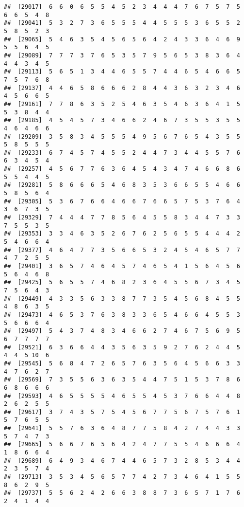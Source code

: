 \documentclass[
]{book}
\begin{document}
\begin{verbatim}
##  [29017]  6  6  0  6  5  5  4  5  2  3  4  4  4  7  6  7  5  7  5  6  6  5  4  8
##  [29041]  5  3  2  7  3  6  5  5  5  4  4  5  5  5  3  6  5  5  2  5  8  5  2  3
##  [29065]  5  4  6  3  5  4  5  6  5  6  4  2  4  3  3  6  4  6  9  5  5  6  4  5
##  [29089]  7  7  7  3  7  6  5  3  5  7  9  5  6  5  3  8  3  6  4  4  4  3  4  5
##  [29113]  5  6  5  1  3  4  4  6  5  5  7  4  4  6  5  4  6  6  5  7  5  7  6  8
##  [29137]  4  4  6  5  8  6  6  6  2  8  4  4  3  6  3  2  3  4  6  4  5  6  6  5
##  [29161]  7  7  8  6  3  5  2  5  4  6  3  5  4  6  3  6  4  1  5  5  3  8  4  4
##  [29185]  4  5  4  5  7  3  4  6  6  2  4  6  7  3  5  5  3  5  5  4  6  4  6  6
##  [29209]  3  5  8  3  4  5  5  5  4  9  5  6  7  6  5  4  3  5  5  5  8  5  5  5
##  [29233]  6  7  4  5  7  4  5  5  2  4  4  7  3  4  4  5  5  7  6  6  3  4  5  4
##  [29257]  4  5  6  7  7  6  3  6  4  5  4  3  4  7  4  6  6  8  6  5  5  4  4  5
##  [29281]  5  8  6  6  6  5  4  6  8  3  5  3  6  6  5  5  4  6  6  5  8  5  6  4
##  [29305]  5  3  6  7  6  6  4  6  6  7  6  6  5  7  5  3  7  6  4  3  6  7  3  5
##  [29329]  7  4  4  4  7  7  8  5  6  4  5  5  8  3  4  4  7  3  3  7  5  5  3  5
##  [29353]  3  3  4  6  3  5  2  6  7  6  2  5  6  5  5  4  4  4  2  5  4  6  6  4
##  [29377]  4  6  4  7  7  3  5  6  6  5  3  2  4  5  4  6  5  7  7  4  7  2  5  5
##  [29401]  3  6  5  7  4  6  4  5  7  4  6  5  4  1  5  6  4  5  6  5  6  4  6  8
##  [29425]  5  6  5  5  7  4  6  8  2  3  6  4  5  5  6  7  3  4  5  7  5  6  4  3
##  [29449]  4  3  3  5  6  3  3  8  7  7  3  5  4  5  6  8  4  5  5  4  8  6  3  5
##  [29473]  4  6  5  3  7  6  3  8  3  3  6  5  4  6  6  4  5  5  3  5  6  6  6  4
##  [29497]  5  4  3  7  4  8  3  4  6  6  2  7  4  6  7  5  6  9  5  6  7  7  7  7
##  [29521]  6  3  6  6  4  4  3  5  6  3  5  9  2  7  6  2  4  4  5  4  4  5 10  6
##  [29545]  5  6  8  4  7  2  6  5  7  6  3  5  6  4  5  6  6  3  3  4  7  6  2  7
##  [29569]  7  3  5  5  6  3  6  3  5  4  4  7  5  1  5  3  7  8  6  6  8  6  6  6
##  [29593]  4  6  5  5  5  5  4  6  5  5  4  5  3  7  6  6  4  4  8  2  6  2  5  5
##  [29617]  3  7  4  3  5  7  5  4  5  6  7  7  5  6  7  5  7  6  1  5  7  6  5  5
##  [29641]  5  5  7  6  3  6  4  8  7  7  5  8  4  2  7  4  4  3  3  5  7  4  7  3
##  [29665]  5  6  6  7  6  5  6  4  2  4  7  7  5  5  4  6  6  6  4  1  8  6  6  4
##  [29689]  6  4  9  3  4  6  7  4  4  6  5  7  3  2  8  5  3  4  4  2  3  5  7  4
##  [29713]  3  5  3  4  5  6  5  7  7  4  2  7  3  4  6  4  1  5  5  8  6  2  9  5
##  [29737]  5  5  6  2  4  2  6  6  3  8  8  7  3  6  5  7  1  7  6  2  4  1  4  4

\end{verbatim}
\end{document}
